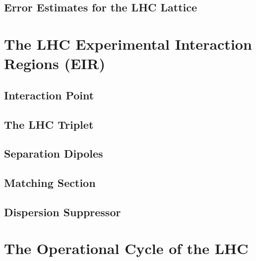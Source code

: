 \subsection{Error Estimates for the LHC Lattice}


\section{The LHC Experimental Interaction Regions (EIR)}

\subsection{Interaction Point}

\subsection{The LHC Triplet}

\subsection{Separation Dipoles}

\subsection{Matching Section}

\subsection{Dispersion Suppressor}


\section{The Operational Cycle of the LHC}

